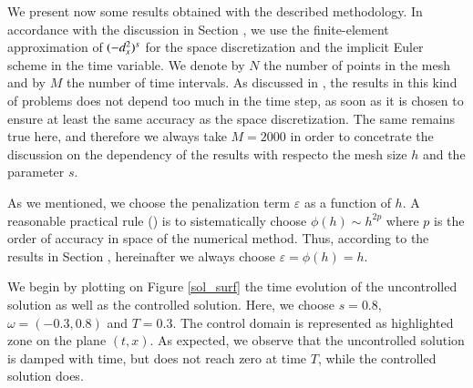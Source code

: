 We present now some results obtained with the described methodology. In accordance with the discussion in Section , we use the finite-element approximation of $(-d_x^2)^{s}$ for the space discretization and the implicit Euler scheme in the time variable. We denote by $N$ the number of points in the mesh and by $M$ the number of time intervals. As discussed in , the results in this kind of problems does not depend too much in the time step, as soon as it is chosen to ensure at least the same accuracy as the space discretization. The same remains true here, and therefore we always take $M=2000$ in order to concetrate the discussion on the dependency of the results with respecto the mesh size $h$ and the parameter $s$.

As we mentioned, we choose the penalization term $\varepsilon$ as a function of $h$. A reasonable practical rule (\cite{}) is to sistematically choose $\phi(h)\sim h^{2p}$ where $p$ is the order of accuracy in space of the numerical method. Thus, according to the results in Section , hereinafter we always choose $\varepsilon=\phi(h)=h$.

We begin by plotting on Figure \ref{sol_surf} the time evolution of the uncontrolled solution as well as the controlled solution. Here, we choose $s=0.8$, $\omega=(-0.3,0.8)$ and $T=0.3$. The control domain is represented as highlighted zone on the plane $(t,x)$. As expected, we observe that the uncontrolled solution is damped with time, but does not reach zero at time $T$, while the controlled solution does. 

%  
%
%
%  
%

